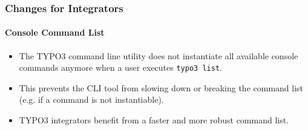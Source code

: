 %

\begin{frame}[fragile]
	\frametitle{Changes for Integrators}
	\framesubtitle{Console Command List}

	\begin{itemize}
		\item The TYPO3 command line utility does not instantiate all available
			console commands anymore when a user executes \texttt{typo3 list}.
		\item This prevents the CLI tool from slowing down or breaking the
			command list (e.g. if a command is not instantiable).
		\item TYPO3 integrators benefit from a faster and more robust command list.
	\end{itemize}

\end{frame}

